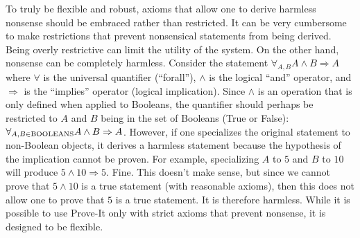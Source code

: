 \documentclass{article}[12pt]
\begin{document}
\begin{description}
  To truly be flexible and robust, axioms that allow one to derive harmless nonsense should be embraced rather than restricted.  It can be very cumbersome to make restrictions that prevent nonsensical statements from being derived.  Being overly restrictive can limit the utility of the system.  On the other hand, nonsense can be completely harmless.  Consider the statement
    $\forall_{A, B} A \land B \Rightarrow A$ where $\forall$ is the universal quantifier (“forall”), $\land$ is the logical “and” operator, and $\Rightarrow$ is the “implies” operator (logical implication).  Since $\land$ is an operation that is only defined when applied to Booleans, the quantifier should perhaps be restricted to $A$ and $B$ being in the set of Booleans (True or False):
    $\forall_{A, B \in {\rm BOOLEANS}} A \land B \Rightarrow A$.
 However, if one specializes the original statement to non-Boolean objects, it derives a harmless statement because the hypothesis of the implication cannot be proven.  For example, specializing $A$ to $5$ and $B$ to $10$ will produce $5 \land 10 \Rightarrow 5$.  Fine.  This doesn’t make sense, but since we cannot prove that $5 \land 10$ is a true statement (with reasonable axioms), then this does not allow one to prove that $5$ is a true statement.  It is therefore harmless.  While it is possible to use Prove-It only with strict axioms that prevent nonsense, it is designed to be flexible.
\end{description}
\end{document}
